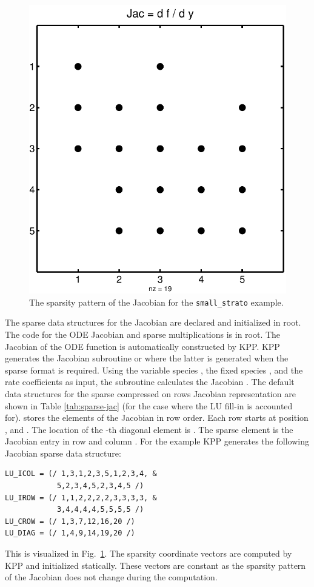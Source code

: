 \documentclass[twoside]{article}
\newcommand{\kpproot}{{\sc root}}
\begin{document}
\begin{figure}[htbp]
  \centering
  \includegraphics[width=0.8\columnwidth]{Figures/small_jac}
  \caption{The sparsity pattern of the Jacobian for the {\tt small\_strato}
    example.}
  \label{fig:jac}
\end{figure}

The sparse data structures for the Jacobian are declared and initialized
in \kpproot{}. The code for the ODE Jacobian and
sparse multiplications is in \kpproot{}. The Jacobian
of the ODE function is automatically constructed by KPP. KPP generates
the Jacobian subroutine  or  where the latter is
generated when the sparse format is required. Using the variable species
, the fixed species , and the rate coefficients
 as input, the subroutine calculates the Jacobian .
The default data structures for the sparse compressed on rows Jacobian
representation are shown in Table \ref{tab:sparse-jac} (for the case
where the LU fill-in is accounted for).  stores the
 elements of the Jacobian in row order. Each row
 starts at position , and
. The location of the -th
diagonal element is . The sparse element 
is the Jacobian entry in row  and column
. For the  example KPP generates the
following Jacobian sparse data structure:
%
\begin{verbatim}
LU_ICOL = (/ 1,3,1,2,3,5,1,2,3,4, &
            5,2,3,4,5,2,3,4,5 /)
LU_IROW = (/ 1,1,2,2,2,2,3,3,3,3, &
            3,4,4,4,4,5,5,5,5 /)
LU_CROW = (/ 1,3,7,12,16,20 /)
LU_DIAG = (/ 1,4,9,14,19,20 /)
\end{verbatim}
%
This is visualized in Fig.~\ref{fig:jac}. The sparsity coordinate
vectors are computed by KPP and initialized statically. These vectors
are constant as the sparsity pattern of the Jacobian does not change
during the computation.
\end{document}

